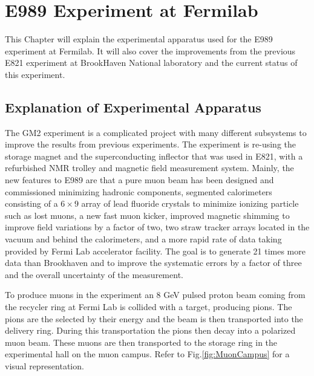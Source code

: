 \documentclass[./Thesis]{subfiles}
\begin{document}
\chapter{E989 Experiment at Fermilab}

This Chapter will explain the experimental apparatus used for the E989 experiment at Fermilab. It will also cover the improvements from the previous E821 experiment at BrookHaven National laboratory and the current status of this experiment.

\section{Explanation of Experimental Apparatus}

	 The GM2 experiment is a complicated project with many different subsystems to improve the results from previous experiments.\cite{TDR} The experiment is re-using the storage magnet and the superconducting inflector that was used in E821, with a refurbished NMR trolley and magnetic field measurement system. Mainly, the new features to E989 are that a pure muon beam has been designed and commissioned minimizing hadronic components, segmented calorimeters consisting of a $6\times9$ array of lead fluoride crystals to minimize ionizing particle such as lost muons, a new fast muon kicker, improved magnetic shimming to improve field variations by a factor of two, two straw tracker arrays located in the vacuum and behind the calorimeters, and a more rapid rate of data taking provided by Fermi Lab accelerator facility. The goal is to generate 21 times more data than Brookhaven and to improve the systematic errors by a factor of three and the overall uncertainty of the measurement. \cite{TDR}


	To produce muons in the experiment an 8 GeV pulsed proton beam coming from the recycler ring at Fermi Lab is collided with a target, producing pions. The pions are the selected by their energy and the beam is then transported into the delivery ring. During this transportation the pions then decay into a polarized muon beam. These muons are then transported to the storage ring in the experimental hall on the muon campus. Refer to Fig.\ref{fig:MuonCampus} for a visual representation. \cite{aepps}
	
\end{document}
